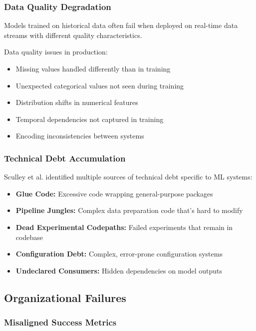 \subsubsection{Data Quality Degradation}

Models trained on historical data often fail when deployed on real-time data streams with different quality characteristics.

\begin{warning}
Data quality issues in production:
\begin{itemize}
    \item Missing values handled differently than in training
    \item Unexpected categorical values not seen during training
    \item Distribution shifts in numerical features
    \item Temporal dependencies not captured in training
    \item Encoding inconsistencies between systems
\end{itemize}
\end{warning}

\subsubsection{Technical Debt Accumulation}

Sculley et al. \citep{sculley2015hidden} identified multiple sources of technical debt specific to ML systems:

\begin{itemize}
    \item \textbf{Glue Code:} Excessive code wrapping general-purpose packages
    \item \textbf{Pipeline Jungles:} Complex data preparation code that's hard to modify
    \item \textbf{Dead Experimental Codepaths:} Failed experiments that remain in codebase
    \item \textbf{Configuration Debt:} Complex, error-prone configuration systems
    \item \textbf{Undeclared Consumers:} Hidden dependencies on model outputs
\end{itemize}

\subsection{Organizational Failures}

\subsubsection{Misaligned Success Metrics}

